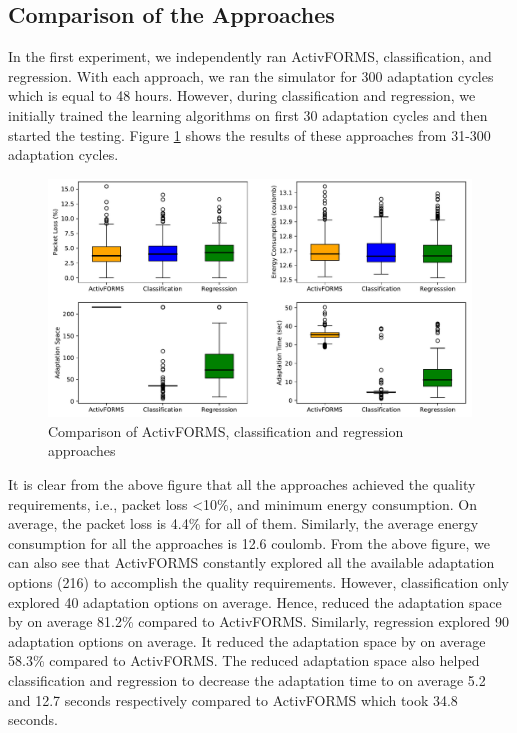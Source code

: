 \documentclass[a4paper,12pt]{article}
\begin{document}
\subsection{Comparison of the Approaches}
In the first experiment, we independently ran ActivFORMS, classification, and regression. With each approach, we ran the simulator for 300 adaptation cycles which is equal to 48 hours. However, during classification and regression, we initially trained the learning algorithms on first 30 adaptation cycles and then started the testing. Figure \ref{Comparison} shows the results of these approaches from 31-300 adaptation cycles.
\begin{figure}[H]
	\centering
	\includegraphics[keepaspectratio, width=\linewidth]{graphs/Comparison.pdf}
	\caption{Comparison of ActivFORMS, classification and regression approaches}
	\label{Comparison}
\end{figure}
It is clear from the above figure that all the approaches achieved the quality requirements, i.e., packet loss <10\%, and minimum energy consumption. On average, the packet loss is  4.4\% for all of them. Similarly, the average energy consumption for all the approaches is  12.6 coulomb. From the above figure, we can also see that ActivFORMS constantly explored all the available adaptation options (216) to accomplish the quality requirements. However, classification only explored 40 adaptation options on average. Hence, reduced the adaptation space by on average 81.2\% compared to ActivFORMS. Similarly, regression explored 90 adaptation options on average. It reduced the adaptation space by on average 58.3\% compared to ActivFORMS. The reduced adaptation space also helped classification and regression to decrease the adaptation time to on average 5.2 and 12.7 seconds respectively compared to ActivFORMS which took 34.8 seconds.
\end{document}

